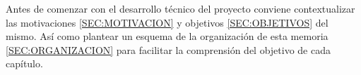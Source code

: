 
Antes de comenzar con el desarrollo técnico del proyecto conviene contextualizar las motivaciones \ref{SEC:MOTIVACION} y objetivos \ref{SEC:OBJETIVOS} del mismo. Así como plantear un esquema de la organización de esta memoria \ref{SEC:ORGANIZACION} para facilitar la comprensión del objetivo de cada capítulo.
